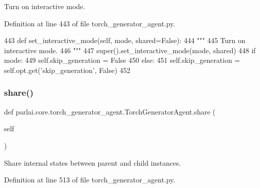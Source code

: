 \begin{DoxyVerb}Turn on interactive mode.
\end{DoxyVerb}
 

Definition at line 443 of file torch\+\_\+generator\+\_\+agent.\+py.


\begin{DoxyCode}
443     \textcolor{keyword}{def }set\_interactive\_mode(self, mode, shared=False):
444         \textcolor{stringliteral}{"""}
445 \textcolor{stringliteral}{        Turn on interactive mode.}
446 \textcolor{stringliteral}{        """}
447         super().set\_interactive\_mode(mode, shared)
448         \textcolor{keywordflow}{if} mode:
449             self.skip\_generation = \textcolor{keyword}{False}
450         \textcolor{keywordflow}{else}:
451             self.skip\_generation = self.opt.get(\textcolor{stringliteral}{'skip\_generation'}, \textcolor{keyword}{False})
452 
\end{DoxyCode}
\mbox{\label{classparlai_1_1core_1_1torch__generator__agent_1_1TorchGeneratorAgent_ad10e64dd33f1add04ba5bcf36b86c2bf}} 
\subsubsection{\texorpdfstring{share()}{share()}}
{\footnotesize\ttfamily def parlai.\+core.\+torch\+\_\+generator\+\_\+agent.\+Torch\+Generator\+Agent.\+share (\begin{DoxyParamCaption}\item[{}]{self }\end{DoxyParamCaption})}

\begin{DoxyVerb}Share internal states between parent and child instances.
\end{DoxyVerb}
 

Definition at line 513 of file torch\+\_\+generator\+\_\+agent.\+py.


